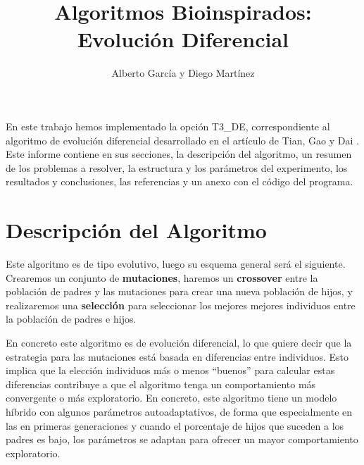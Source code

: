 \documentclass{article}
\title{Algoritmos Bioinspirados: Evolución Diferencial}
\author{Alberto García y Diego Martínez}
\begin{document}
\maketitle
En este trabajo hemos implementado la opción T3\_DE, correspondiente al algoritmo de evolución diferencial desarrollado en el artículo de Tian, Gao y Dai \cite{mainPaper}. Este informe contiene en sus secciones, la descripción del algoritmo, un resumen de los problemas a resolver, la estructura y los parámetros del experimento, los resultados y conclusiones, las referencias y un anexo con el código del programa.

\section{Descripción del Algoritmo}
Este algoritmo es de tipo evolutivo, luego su esquema general será el siguiente. Crearemos un conjunto de \textbf{mutaciones}, haremos un \textbf{crossover} entre la población de padres y las mutaciones para crear una nueva población de hijos, y realizaremos una \textbf{selección} para seleccionar los mejores mejores individuos entre la población de padres e hijos.

En concreto este algoritmo es de evolución diferencial, lo que quiere decir que la estrategia para las mutaciones está basada en diferencias entre individuos. Esto implica que la elección individuos más o menos ``buenos'' para calcular estas diferencias contribuye a que el algoritmo tenga un comportamiento más convergente o más exploratorio. En concreto, este algoritmo tiene un modelo híbrido con algunos parámetros autoadaptativos, de forma que especialmente en las en primeras generaciones y cuando el porcentaje de hijos que suceden a los padres es bajo, los parámetros se adaptan para ofrecer un mayor comportamiento exploratorio.
\end{document}
